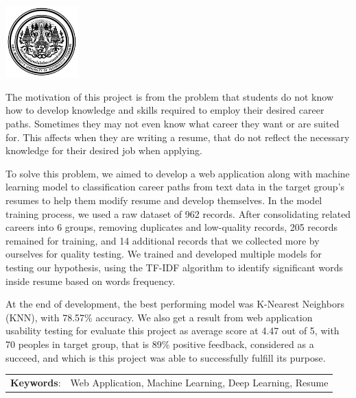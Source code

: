 \documentclass[12pt,oneside,openright,a4paper]{cpe-thai-project}
\begin{document}
\pdfstringdefDisableCommands{%
    \let\MakeUppercase\relax
}

\begin{center}
    \includegraphics[width=2.8cm]{logo02.jpg}
\end{center}
\vspace*{-1cm}

\maketitlepage
\makesignaturepage

\abstract

The motivation of this project is from the problem that students do not know how to develop knowledge and skills required to 
employ their desired career paths. Sometimes they may not even know what career they want or are suited for. This affects when 
they are writing a resume, that do not reflect the necessary knowledge for their desired job when applying.

To solve this problem, we aimed to develop a web application along with machine learning model to classification career paths from 
text data in the target group's resumes to help them modify resume and develop themselves. In the model training process, we used a raw dataset of 962 records.
After consolidating related careers into 6 groups, removing duplicates and low-quality records, 205 records remained 
for training, and 14 additional records that we collected more by ourselves for quality testing. We trained and developed multiple 
models for testing our hypothesis, using the TF-IDF algorithm to identify significant words inside resume based on words frequency.

At the end of development, the best performing model was K-Nearest Neighbors (KNN), with 78.57\% accuracy.
We also get a result from web application usability testing for evaluate this project as average score at 4.47 out of 5,
with 70 peoples in target group, that is 89\% positive feedback, considered as a succeed, and which is this project 
was able to successfully fulfill its purpose.

\begin{flushleft}
    \begin{tabular*}{\textwidth}{@{}lp{}}
        \textbf{Keywords}: & Web Application, Machine Learning, Deep Learning, Resume
    \end{tabular*}
\end{flushleft}
\endabstract
\end{document}
